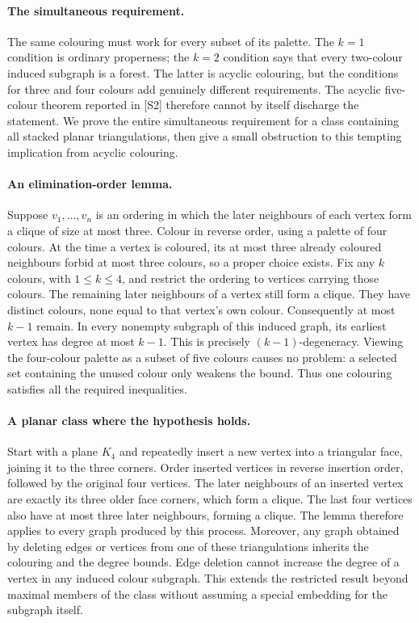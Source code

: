 \documentclass[11pt,a4paper]{article}
\begin{document}
\paragraph{The simultaneous requirement.}
The same colouring must work for every subset of its palette.
The $k=1$ condition is ordinary properness; the $k=2$ condition says
that every two-colour induced subgraph is a forest. The latter is
acyclic colouring, but the conditions for three and four colours add
genuinely different requirements. The acyclic five-colour theorem
reported in [S2] therefore cannot by itself discharge the statement.
We prove the entire simultaneous requirement for a class containing
all stacked planar triangulations, then give a small obstruction to
this tempting implication from acyclic colouring.

\paragraph{An elimination-order lemma.}
Suppose $v_1,\ldots,v_n$ is an ordering in which the later neighbours
of each vertex form a clique of size at most three. Colour in reverse
order, using a palette of four colours. At the time a vertex is
coloured, its at most three already coloured neighbours forbid at
most three colours, so a proper choice exists.
Fix any $k$ colours, with $1\le k\le4$, and restrict the ordering
to vertices carrying those colours. The remaining later neighbours
of a vertex still form a clique. They have distinct colours, none
equal to that vertex's own colour. Consequently at most $k-1$ remain.
In every nonempty subgraph of this induced graph, its earliest vertex
has degree at most $k-1$. This is precisely $(k-1)$-degeneracy.
Viewing the four-colour palette as a subset of five colours causes no
problem: a selected set containing the unused colour only weakens
the bound. Thus one colouring satisfies all the required inequalities.

\paragraph{A planar class where the hypothesis holds.}
Start with a plane $K_4$ and repeatedly insert a new vertex into a
triangular face, joining it to the three corners. Order inserted
vertices in reverse insertion order, followed by the original four
vertices. The later neighbours of an inserted vertex are exactly
its three older face corners, which form a clique. The last four
vertices also have at most three later neighbours, forming a clique.
The lemma therefore applies to every graph produced by this process.
Moreover, any graph obtained by deleting edges or vertices from one
of these triangulations inherits the colouring and the degree
bounds. Edge deletion cannot increase the degree of a vertex in any
induced colour subgraph. This extends the restricted result beyond
maximal members of the class without assuming a special embedding
for the subgraph itself.
\end{document}
